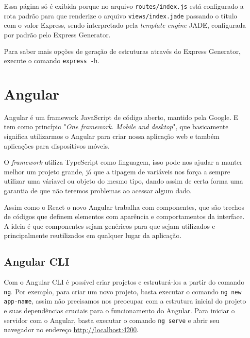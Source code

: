 \documentclass[
	12pt,				%
	openright,			%
	twoside,			%
	a4paper,			%
	english,			%
	brazil				%
	]{abntex2}
\begin{document}
Essa página só é exibida porque no arquivo \verb|routes/index.js| está configurado a rota padrão para que renderize o arquivo \verb|views/index.jade| passando o título com o valor Express, sendo interpretado pela \textit{template engine} JADE, configurada por padrão pelo Express Generator.

Para saber mais opções de geração de estruturas através do Express Generator, execute o comando \verb|express -h|.

\section{Angular}

Angular é um framework JavaScript de código aberto, mantido pela Google. E tem como princípio "\textit{One framework. Mobile and desktop}", que basicamente significa utilizarmos o Angular para criar nossa aplicação web e também aplicações para dispositivos móveis.

O \textit{framework} utiliza TypeScript como linguagem, isso pode nos ajudar a manter melhor um projeto grande, já que a tipagem de variáveis nos força a sempre utilizar uma váriavel ou objeto do mesmo tipo, dando assim de certa forma uma garantia de que não teremos problemas ao acessar algum dado.


Assim como o React o novo Angular trabalha com componentes, que são trechos de códigos que definem elementos com aparência e comportamentos da interface. A ideia é que componentes sejam genéricos para que sejam utilizados e principalmente reutilizados em qualquer lugar da aplicação.

\subsection{Angular CLI} 


Com o Angular CLI é possível criar projetos e estruturá-los a partir do comando \verb|ng|. Por exemplo, para criar um novo projeto, basta executar o comando \verb|ng new app-name|, assim não precisamos nos preocupar com a estrutura inicial do projeto e suas dependências cruciais para o funcionamento do Angular. Para iniciar o servidor com o Angular, basta executar o comando \verb|ng serve| e abrir seu navegador no endereço \href{http://localhost:4200}{http://localhost:4200}.

\end{document}
